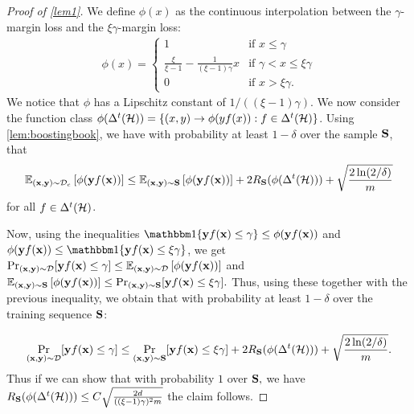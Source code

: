  
  \begin{proof}[Proof of \cref{lem1}]
  We define $\phi(x)$ as the continuous interpolation between the $\gamma$-margin loss and the $\xi\gamma$-margin loss:
  \begin{align*}
    \phi(x)=\begin{cases}
    1 & \text{if } x \leq \gamma\\
    \frac{\xi}{\xi-1}-\frac{1}{(\xi-1)\gamma}x & \text{if } \gamma< x \leq \xi\gamma\\
    0 & \text{if } x > \xi\gamma.
    \end{cases}
  \end{align*}
  We notice that $\phi$ has a Lipschitz constant of $1/((\xi-1)\gamma)$. We now consider the function class  $\phi(\Delta^{t}(\mathcal{H}))=\{(x,y)\rightarrow \phi(yf(x)):f\in\Delta^{t}(\mathcal{H}) \}$.
  Using \cref{lem:boostingbook}, we have with probability at least $1-\delta$ over the sample $\mathbf{S}$, that 
  \begin{align*}\mathbb{E}_{(\mathbf{x},\mathbf{y}) \sim \mathcal{D}_{c}}\left[\phi(\mathbf{y} f(\mathbf{x}))\right]\leq \mathbb{E}_{(\mathbf{x},\mathbf{y}) \sim \mathbf{S}}\left[\phi(\mathbf{y}  f(\mathbf{x}))\right]+2 R_{\mathbf{S}}(\phi(\Delta^{t}(\mathcal{H})))+\sqrt{\frac{2 \ln (2 / \delta)}{m}}\end{align*}
  for all $f\in \Delta^{t}(\mathcal{H})$.
  
  Now, using the inequalities $\ind\{\ry f(\rx) \leq \gamma\} \leq \phi(\ry f(\rx))$ and $\phi(\ry f(\rx)) \leq \ind\{\ry f(\rx) \leq \xi\gamma\}$, we get $\Pr_{(\mathbf{x},\mathbf{y})\sim \mathcal{D}}[\mathbf{y} f(\mathbf{x}) \leq \gamma] \leq \mathbb{E}_{(\mathbf{x},\mathbf{y}) \sim \mathcal{D}}\left[\phi(\mathbf{y} f(\mathbf{x}))\right] $ and $\mathbb{E}_{(\mathbf{x},\mathbf{y}) \sim \mathbf{S} }\left[\phi(\mathbf{y} f(\mathbf{x}))\right] \leq \Pr_{(\mathbf{x},\mathbf{y})\sim\mathbf{S}}[\mathbf{y} f(\mathbf{x}) \leq \xi\gamma].$ Thus, using these together with the previous inequality, we obtain that with probability at least $1-\delta$ over the training sequence $\mathbf{S}$:
  
  \begin{align}\label{eq:dlhproperty}
    \Pr_{(\mathbf{x},\mathbf{y})\sim \mathcal{D}}[\mathbf{y} f(\mathbf{x}) \leq \gamma] \leq \Pr_{(\mathbf{x},\mathbf{y})\sim\mathbf{S}}[\mathbf{y} f(\mathbf{x}) \leq \xi \gamma] +2 R_{\mathbf{S}}(\phi(\Delta^{t}(\mathcal{H})))+\sqrt{\frac{2 \ln (2 / \delta)}{m}}.
  \end{align}
Thus if we can show that with probability $1$ over $\mathbf{S},$ we have $R_{\mathbf{S}}(\phi(\Delta^{t}(\mathcal{H})))\leq C\sqrt{\frac{2d}{((\xi-1)\gamma)^2m}}$ the claim follows.
  

\end{proof}
